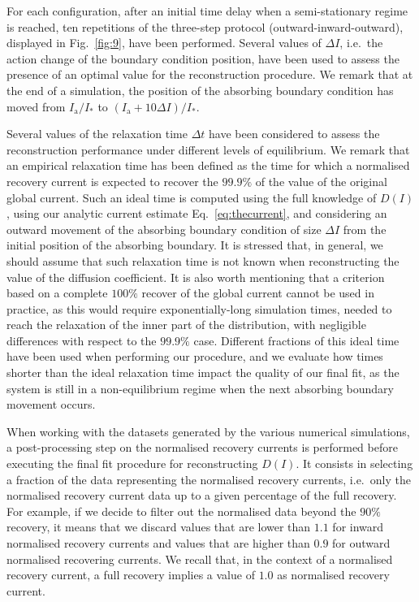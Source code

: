 For each configuration, after an initial time delay when a semi-stationary regime is reached, ten repetitions of the three-step protocol (outward-inward-outward), displayed in Fig.~\ref{fig:9}, have been performed. Several values of $\Delta I$, i.e.\ the action change of the boundary condition position, have been used to assess the presence of an optimal value for the reconstruction procedure. We remark that at the end of a simulation, the position of the absorbing boundary condition has moved from $I_\mathrm{a}/I_\ast$ to $(I_\mathrm{a} + 10\Delta I) / I_\ast$. 

Several values of the relaxation time $\Delta t$ have been considered to assess the reconstruction performance under different levels of equilibrium. We remark that an empirical relaxation time has been defined as the time for which a normalised recovery current is expected to recover the $99.9\%$ of the value of the original global current. Such an ideal time is computed using the full knowledge of $D(I)$, using our analytic current estimate Eq.~\eqref{eq:thecurrent}, and considering an outward movement of the absorbing boundary condition of size $\Delta I$ from the initial position of the absorbing boundary. It is stressed that, in general, we should assume that such relaxation time is not known when reconstructing the value of the diffusion coefficient. It is also worth mentioning that a criterion based on a complete $100\%$ recover of the global current cannot be used in practice, as this would require exponentially-long simulation times, needed to reach the relaxation of the inner part of the distribution, with negligible differences with respect to the $99.9\%$ case. Different fractions of this ideal time have been used when performing our procedure, and we evaluate how times shorter than the ideal relaxation time impact the quality of our final fit, as the system is still in a non-equilibrium regime when the next absorbing boundary movement occurs.

When working with the datasets generated by the various numerical simulations, a post-processing step on the normalised recovery currents is performed before executing the final fit procedure for reconstructing $D(I)$. It consists in selecting a fraction of the data representing the normalised recovery currents, i.e.\ only the normalised recovery current data up to a given percentage of the full recovery. For example, if we decide to filter out the normalised data beyond the $90\%$ recovery, it means that we discard values that are lower than $1.1$ for inward normalised recovery currents and values that are higher than $0.9$ for outward normalised recovering currents. We recall that, in the context of a normalised recovery current, a full recovery implies a value of $1.0$ as normalised recovery current.

